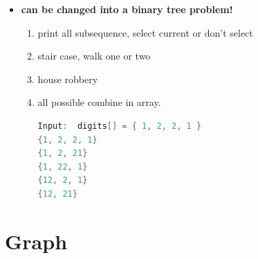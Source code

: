 \documentclass[a4paper,11pt,twoside]{book}
\begin{document}
\begin{itemize}
\item \textbf{can be changed into a binary tree problem!}
\begin{enumerate}
	\item print all subsequence, select current or don't select
	\item stair case, walk one or two
	\item house robbery
	\item all possible combine in array. 
	
\begin{lstlisting}[frame=single, language=c++]	
Input:  digits[] = { 1, 2, 2, 1 }	
{1, 2, 2, 1} 
{1, 2, 21} 
{1, 22, 1} 
{12, 2, 1} 
{12, 21} 
\end{lstlisting}
\end{enumerate}

\end{itemize}

\section{Graph}
\end{document}
